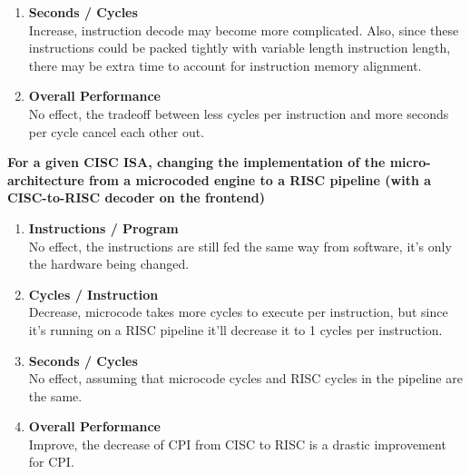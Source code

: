 \documentclass[11pt]{article}
\begin{document}
\begin{Parts}
\begin{enumerate}[i]
		      Decrease, there will smaller instructions to fetch, and cycles can decrease since memory latency can be improved. This is if all the instructions fetched fit in the instruction cache.
		\item \textbf{Seconds / Cycles} \\
		      Increase, instruction decode may become more complicated. Also, since these instructions could be packed tightly with variable length instruction length, there may be extra time to account for instruction memory alignment.
		\item \textbf{Overall Performance} \\
		      No effect, the tradeoff between less cycles per instruction and more seconds per cycle cancel each other out.
	\end{enumerate}
	\Part \textbf{For a given CISC ISA, changing the implementation of the micro-architecture from a microcoded engine to a RISC pipeline (with a CISC-to-RISC decoder on the frontend)}
	\begin{enumerate}[i]
		\item \textbf{Instructions / Program} \\
		      No effect, the instructions are still fed the same way from software, it's only the hardware being changed.
		\item \textbf{Cycles / Instruction} \\
		      Decrease, microcode takes more cycles to execute per instruction, but since it's running on a RISC pipeline it'll decrease it to 1 cycles per instruction.
		\item \textbf{Seconds / Cycles} \\
		      No effect, assuming that microcode cycles and RISC cycles in the pipeline are the same.
		\item \textbf{Overall Performance} \\
		      Improve, the decrease of CPI from CISC to RISC is a drastic improvement for CPI.
	\end{enumerate}
\end{Parts}




\end{document}
